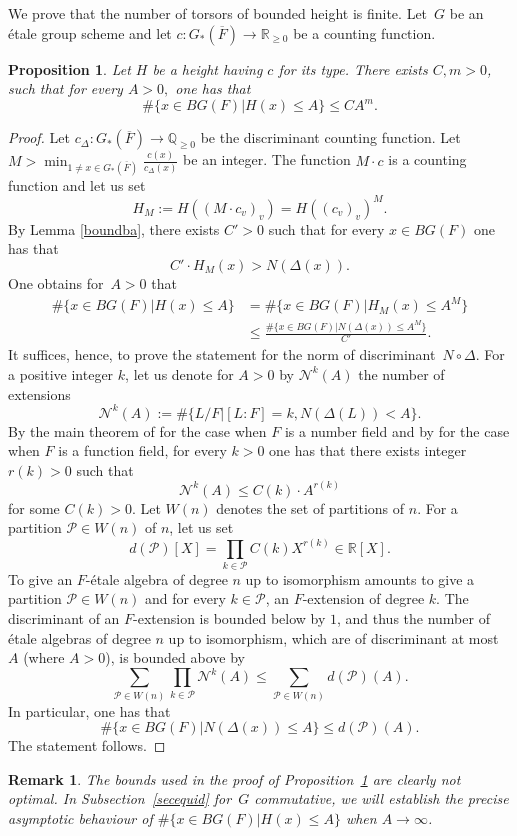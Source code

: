 \documentclass[a4paper,english,12pt]{amsart}
\newcommand{\QQ}{\mathbb{Q}}
\newcommand{\RR}{\mathbb{R}}
\newcommand{\oF}{\overline F}
\newtheorem{prop}[equation]{Proposition}
\newtheorem{rem}[equation]{Remark}
\numberwithin{equation}{subsection}
\begin{document}
\subsubsection{}  We prove that the number of torsors of bounded height is finite. Let~$G$ be an \' etale group scheme and let $c:G_*(\oF)\to\RR_{\geq 0}$ be a counting function.
\begin{prop}\label{estimatenumber}
Let $H$ be a height having $c$ for its type.  There exists $C,m>0$, such that for every $A>0,$ one has that $$\#\{x\in BG(F)|H(x)\leq A\}\leq CA^m.$$
\end{prop}
\begin{proof}
Let $c_{\Delta}:G_*(\overline F)\to\QQ_{\geq 0}$ be the discriminant counting function. Let $M>\min_{1\neq x\in G_*(\overline F)}\frac{c(x)}{c_\Delta(x)}$ be an integer. The function $M\cdot c$ is a counting function and let us set $$H_M:=H((M\cdot c_v)_v)=H((c_v)_v)^M.$$ By Lemma \ref{boundba}, there exists $C'>0$ such that for every $x\in BG(F)$ one has that  $$C'\cdot H_M(x)>N(\Delta(x)).$$ One obtains for~$A>0$ that
\begin{align*}\#\{x\in BG(F)|H(x)\leq A\}&=\#\{x\in BG(F)|H_M(x)\leq A^M\}\\&\leq \frac{\#\{x\in BG(F)|N(\Delta(x))\leq A^M\}}{C'}.
\end{align*}
It suffices, hence, to prove the statement for the norm of discriminant~$N\circ\Delta$. %
For a positive integer $k$, let us denote for $A>0$ by $\mathcal N^k(A)$ the number of extensions $$\mathcal N^k(A):=\#\{L/F|[L:F]=k, N(\Delta(L))<A\}.$$ By the main theorem of \cite{SchmidtNF} for the case when $F$ is a number field and by \cite[Lemma 2.4]{Gmethodant} for the case when $F$ is a function field, for every $k>0$ one has that there exists integer $r(k)>0$ such that $$\mathcal N^k(A)\leq C(k)\cdot A^{r(k)}$$ for some $C(k)>0$. Let $W(n)$ denotes the set of partitions of $n$. For a partition $\mathcal P\in W(n)$ of $n$, let us set  $$d(\mathcal P)[X]=\prod_{k\in\mathcal P}C(k)X^{r(k)}\in \RR[X].$$ To give an $F$-\' etale algebra of degree $n$ up to isomorphism amounts to give a partition $\mathcal P\in W(n)$ and for every $k\in\mathcal P$, an $F$-extension of degree $k$. The discriminant of an $F$-extension is bounded below by $1$, and thus the number of \' etale algebras of degree $n$ up to isomorphism, which are of discriminant at most $A$ (where $A>0$), is bounded above by $$\sum_{\mathcal P\in W(n)}\prod_{k\in\mathcal P}\mathcal N^k(A)\leq\sum_{\mathcal P\in W(n)}d(\mathcal P)(A).$$ In particular, one has that $$\#\{x\in BG(F)|N(\Delta(x))\leq A\}\leq d(\mathcal P)(A).$$The statement follows.
\end{proof}
\begin{rem}
\normalfont
The bounds used in the proof of Proposition~\ref{estimatenumber} are clearly not optimal. In Subsection~\ref{secequid} for~$G$ commutative, we will establish the precise asymptotic behaviour of $\#\{x\in BG(F)|H(x)\leq A\}$ when $A\to\infty$. 
\end{rem}
\end{document}
